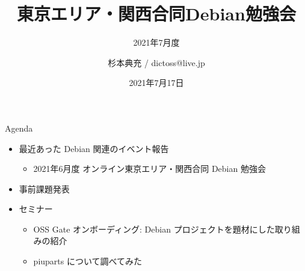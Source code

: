 \title{東京エリア・関西合同Debian勉強会}
\subtitle{2021年7月度} %
\author{杉本典充 / dictoss@live.jp}
\date{2021年7月17日}



\begin{frame}
\titlepage{}
\end{frame}

\begin{frame}{Agenda}
 \begin{minipage}[t]{0.45\hsize}
  \begin{itemize}
  \item 最近あった Debian 関連のイベント報告
    \begin{itemize}
    \item 2021年6月度 オンライン東京エリア・関西合同 Debian 勉強会
    \end{itemize}
  \item 事前課題発表
  \end{itemize}
 \end{minipage}
 \begin{minipage}[t]{0.45\hsize}
   \begin{itemize}
   \item セミナー
     \begin{itemize}
      \item OSS Gate オンボーディング: Debian プロジェクトを題材にした取り組みの紹介
      \item piuparts について調べてみた
     \end{itemize}
  \end{itemize}
 \end{minipage}
\end{frame}

